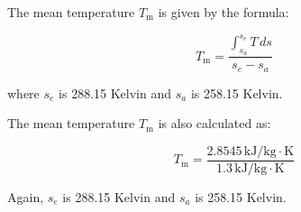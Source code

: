The mean temperature \( T_{\text{m}} \) is given by the formula:

\[
T_{\text{m}} = \frac{\int_{s_a}^{s_e} T \, ds}{s_e - s_a}
\]

where \( s_e \) is 288.15 Kelvin and \( s_a \) is 258.15 Kelvin.

The mean temperature \( T_{\text{m}} \) is also calculated as:

\[
T_{\text{m}} = \frac{2.8545 \, \text{kJ/kg} \cdot \text{K}}{1.3 \, \text{kJ/kg} \cdot \text{K}}
\]

Again, \( s_e \) is 288.15 Kelvin and \( s_a \) is 258.15 Kelvin.